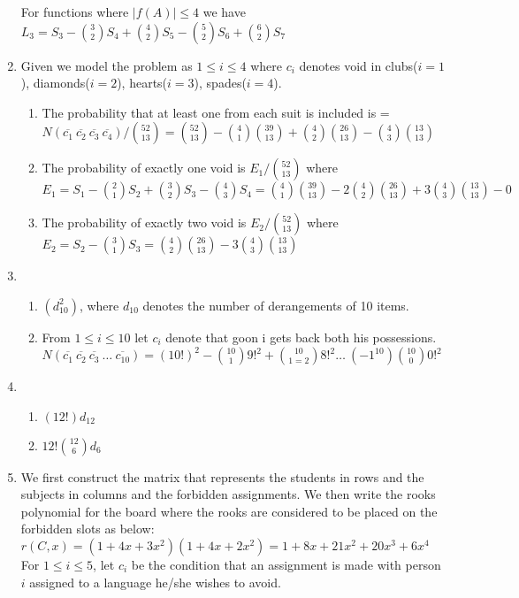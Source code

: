 \documentclass[a4paper]{article}
\begin{document}
\begin{enumerate}
For functions where $|f(A)|\leq 4$ we have $L_3 = S_3 - {{3\choose 2}S_4} + {{4\choose 2}S_5} -  {{5\choose 2}S_6} + {{6\choose 2}S_7} $

\item Given we model the problem as $1\leq i\leq 4$ where $c_i$ denotes void in clubs($i=1$), diamonds($i=2$), hearts($i=3$), spades($i=4$).\\
\begin{enumerate}
\item The probability that at least one from each suit is included is = $N(\overline{c_1}~\overline{c_2}~\overline{c_3}~\overline{c_4})/ {52\choose 13} = {52 \choose 13} -{4\choose 1}{39 \choose 13} + {4\choose 2}{26 \choose 13} - {4\choose 3}{13 \choose 13}$ 

\item The probability of exactly one void is $E_1/{52\choose 13}$ where $E_1 = S_1-{{2\choose 1}S_2} + {{3\choose 2}S_3} -{{4\choose 3}S_4} = {{4\choose 1}{39\choose 13}} -2{{4\choose 2}{26\choose 13}} + 3{{4\choose 3}{13\choose 13}} - 0 $

\item  The probability of exactly two void is $E_2/{52\choose 13}$ where $E_2 = S_2-{{3\choose 1}S_3} = {{4\choose 2}{26\choose 13}} - 3{{4\choose 3}{13\choose 13}}$ 
\end{enumerate} 


\item 
\begin{enumerate}
\item $(d_{10}^2)$, where $d_{10}$ denotes the number of derangements of 10 items. 
\item From $1\leq i\leq 10$ let $c_i$ denote that goon i gets back both his possessions.\\
$N(\overline{c_1}~\overline{c_2}~\overline{c_3}~\dots~\overline{c_10}) = (10!)^2 - {{10\choose 1}9!^2} + {{10\choose 1=2}8!^2} \dots ~ (-1^{10}){{10\choose 0}0!^2}$
\end{enumerate}


\item 
\begin{enumerate}
\item $(12!)d_{12}$
\item $12!{12\choose 6}d_6$
\end{enumerate}




\item We first construct the matrix that represents the students in rows and the subjects in columns and the forbidden assignments. We then write the rooks polynomial for the board where the rooks are considered to be placed on the forbidden slots as below: \\ 
$r(C,x)=(1+4x+3x^2)(1+4x+2x^2)= 1+8x+21x^2+ 20x^3+6x^4$\\
For $1\leq i \leq 5$, let $c_i$ be the condition that an assignment is made with person $i$ assigned to a language he/she wishes to avoid.\\


\end{enumerate}
\end{document}
